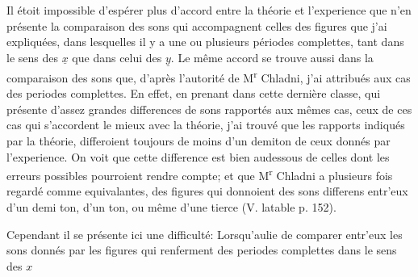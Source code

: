 \documentclass[11pt,a4paper]{article}
\begin{document}

Il étoit impossible d'espérer plus d'accord entre la théorie
et l'experience que n'en présente la comparaison des sons
qui accompagnent  celles des figures que j'ai
expliquées, dans lesquelles il y a une ou plusieurs périodes
complettes, tant dans le sens des $\underline{x}$ que dans celui des $\underline{y}$.
Le même accord se trouve aussi dans la comparaison
des sons que, d'après l'autorité de M\textsuperscript{r} Chladni, j'ai
attribués aux cas des periodes complettes. En effet, 
en prenant  dans cette dernière classe, qui présente
d'assez grandes differences de sons rapportés aux mêmes
cas, ceux de ces cas qui s'accordent le mieux avec
la théorie, j'ai trouvé que les rapports indiqués
par la théorie, differoient toujours de moins d'un demiton
de ceux donnés par l'experience. On voit que cette
difference est bien audessous de celles dont les erreurs
possibles pourroient rendre compte; et que M\textsuperscript{r}
Chladni a plusieurs fois regardé comme equivalantes,
des figures qui donnoient des sons differens entr'eux
d'un demi ton, d'un ton, ou même d'une tierce
(V. latable p. 152).

Cependant il se présente ici une difficulté: Lorsqu'aulie
de comparer entr'eux les sons donnés par les figures
qui renferment des periodes complettes dans le sens des $x$
\end{document}
